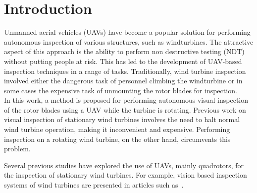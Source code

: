 \section{Introduction}
\label{sec:introduction}

Unmanned aerial vehicles (UAVs) have become a popular solution for performing autonomous inspection of various structures, such as windturbines. The attractive aspect of this approach is the ability to perform non destructive testing (NDT) without putting people at risk. This has led to the development of UAV-based inspection techniques in a range of tasks. Traditionally, wind turbine inspection involved either the dangerous task of personnel climbing the windturbine or in some cases the expensive task of unmounting the rotor blades for inspection.\\
In this work, a method is proposed for performing autonomous visual inspection of the rotor blades using a UAV while the turbine is rotating. Previous work on visual inspection of stationary wind turbines involves the need to halt normal wind turbine operation, making it inconvenient and expensive. Performing inspection on a rotating wind turbine, on the other hand, circumvents this problem. 


Several previous studies have explored the use of UAVs, mainly quadrotors, for the inspection of stationary wind turbines. For example, vision based inspection systems of wind turbines are presented in articles such as~\cite{weibin_gu, stokkeland2015, schafer2016, ref:Car2020}.

